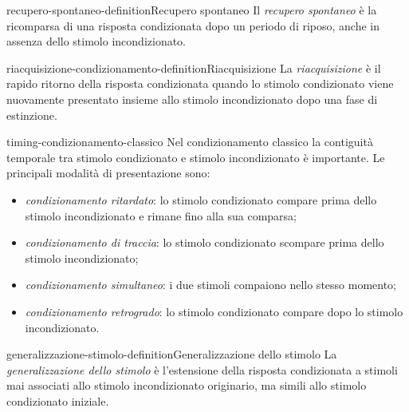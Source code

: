 \documentclass[preview]{standalone}
\begin{document}
\begin{snippetdefinition}{recupero-spontaneo-definition}{Recupero spontaneo}
    Il \emph{recupero spontaneo} è la ricomparsa di una risposta condizionata
    dopo un periodo di riposo, anche in assenza dello stimolo incondizionato.
\end{snippetdefinition}

\begin{snippetdefinition}{riacquisizione-condizionamento-definition}{Riacquisizione}
    La \emph{riacquisizione} è il rapido ritorno della risposta condizionata
    quando lo stimolo condizionato viene nuovamente presentato insieme allo
    stimolo incondizionato dopo una fase di estinzione.
\end{snippetdefinition}


\begin{snippet}{timing-condizionamento-classico}
    Nel condizionamento classico la contiguità temporale tra stimolo
    condizionato e stimolo incondizionato è importante. Le principali modalità
    di presentazione sono:
    \begin{itemize}
        \item \emph{condizionamento ritardato}: lo stimolo condizionato compare
        prima dello stimolo incondizionato e rimane fino alla sua comparsa;
        \item \emph{condizionamento di traccia}: lo stimolo condizionato
        scompare prima dello stimolo incondizionato;
        \item \emph{condizionamento simultaneo}: i due stimoli compaiono nello
        stesso momento;
        \item \emph{condizionamento retrogrado}: lo stimolo condizionato compare
        dopo lo stimolo incondizionato.
    \end{itemize}
\end{snippet}


\begin{snippetdefinition}{generalizzazione-stimolo-definition}{Generalizzazione dello stimolo}
    La \emph{generalizzazione dello stimolo} è l'estensione della risposta
    condizionata a stimoli mai associati allo stimolo incondizionato originario,
    ma simili allo stimolo condizionato iniziale.
\end{snippetdefinition}
\end{document}
